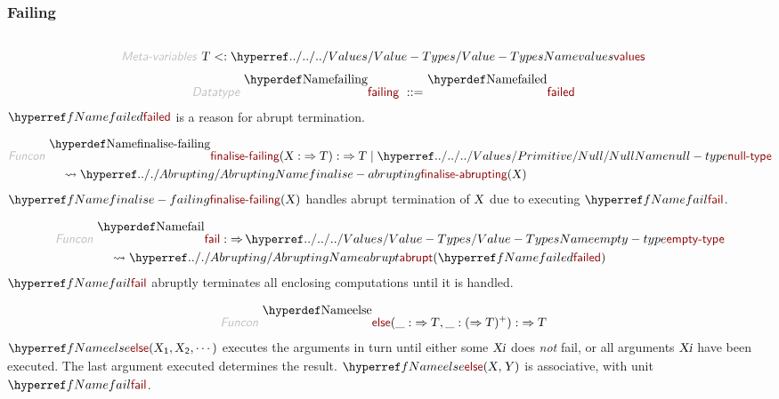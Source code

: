 \subsubsection*{Failing}\hypertarget{failing}{}\label{failing}

\begin{align*}
  [ ~ 
  \KEY{Datatype} ~ & \NAMEREF{failing} \\
  \KEY{Funcon} ~ & \NAMEREF{failed} \\
  \KEY{Funcon} ~ & \NAMEREF{finalise-failing} \\
  \KEY{Funcon} ~ & \NAMEREF{fail} \\
  \KEY{Funcon} ~ & \NAMEREF{else} \\
  \KEY{Funcon} ~ & \NAMEREF{else-choice} \\
  \KEY{Funcon} ~ & \NAMEREF{checked} \\
  \KEY{Funcon} ~ & \NAMEREF{check-true}
  ~ ]
\end{align*}
\begin{align*}
  \KEY{Meta-variables} ~ 
  & \VAR{T} <: \NAMEHYPER{../../../Values}{Value-Types}{values}
\end{align*}
\begin{align*}
  \KEY{Datatype} ~ 
  \NAMEDECL{failing}  
  ~ ::= ~ & \NAMEDECL{failed} 
\end{align*}
$\SHADE{\NAMEREF{failed}}$ is a reason for abrupt termination.

\begin{align*}
  \KEY{Funcon} ~ 
  & \NAMEDECL{finalise-failing}(\VAR{X} :  \TO \VAR{T}) :  \TO \VAR{T} \mid \NAMEHYPER{../../../Values/Primitive}{Null}{null-type} \\
  & \quad \leadsto \NAMEHYPER{../.}{Abrupting}{finalise-abrupting}
                     ( \VAR{X} )
\end{align*}
$\SHADE{\NAMEREF{finalise-failing}
           ( \VAR{X} )}$ handles abrupt termination of $\SHADE{\VAR{X}}$ due to executing $\SHADE{\NAMEREF{fail}}$.

\begin{align*}
  \KEY{Funcon} ~ 
  & \NAMEDECL{fail} :  \TO \NAMEHYPER{../../../Values}{Value-Types}{empty-type} \\
  & \quad \leadsto \NAMEHYPER{../.}{Abrupting}{abrupt}
                     ( \NAMEREF{failed} )
\end{align*}
$\SHADE{\NAMEREF{fail}}$ abruptly terminates all enclosing computations until it is handled.

\begin{align*}
  \KEY{Funcon} ~ 
  & \NAMEDECL{else}(\_ :  \TO \VAR{T}, \_ : (  \TO \VAR{T} )\PLUS) :  \TO \VAR{T}
\end{align*}
$\SHADE{\NAMEREF{else}
           ( \VAR{X}\SUB{1},   
             \VAR{X}\SUB{2},   
             \cdots )}$ executes the arguments in turn until either some
  $\SHADE{\VAR{Xi}}$ does \emph{not} fail, or all arguments $\SHADE{\VAR{Xi}}$ have been executed.
  The last argument executed determines the result.
  $\SHADE{\NAMEREF{else}
           ( \VAR{X},   
             \VAR{Y} )}$ is associative, with unit $\SHADE{\NAMEREF{fail}}$.

